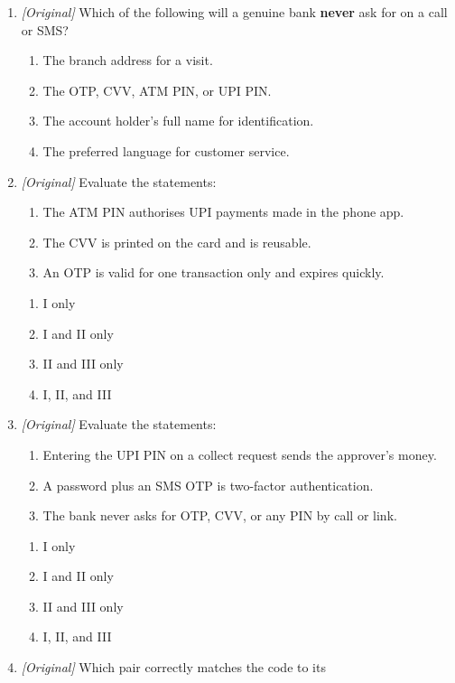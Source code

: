 \documentclass[11pt]{article}
\begin{document}
\begin{enumerate}[label=\textbf{Q\arabic*.}, leftmargin=*]
\item \textit{[Original]} Which of the following will a genuine bank
  \textbf{never} ask for on a call or SMS?
  \begin{enumerate}[label=\Alph*.]
    \item The branch address for a visit.
    \item The OTP, CVV, ATM PIN, or UPI PIN.
    \item The account holder's full name for identification.
    \item The preferred language for customer service.
  \end{enumerate}
\item \textit{[Original]} Evaluate the statements:
  \begin{enumerate}[label=\Roman*.]
    \item The ATM PIN authorises UPI payments made in the phone app.
    \item The CVV is printed on the card and is reusable.
    \item An OTP is valid for one transaction only and expires quickly.
  \end{enumerate}
  \begin{enumerate}[label=\Alph*.]
    \item I only
    \item I and II only
    \item II and III only
    \item I, II, and III
  \end{enumerate}
\item \textit{[Original]} Evaluate the statements:
  \begin{enumerate}[label=\Roman*.]
    \item Entering the UPI PIN on a collect request sends the approver's
      money.
    \item A password plus an SMS OTP is two-factor authentication.
    \item The bank never asks for OTP, CVV, or any PIN by call or link.
  \end{enumerate}
  \begin{enumerate}[label=\Alph*.]
    \item I only
    \item I and II only
    \item II and III only
    \item I, II, and III
  \end{enumerate}
\item \textit{[Original]} Which pair correctly matches the code to its

\end{enumerate}
\end{document}
